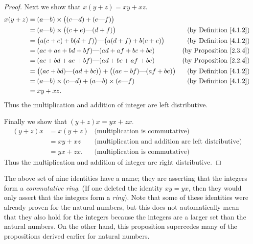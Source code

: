 \begin{proof}
    Next we show that \(x(y + z) = xy + xz\).
    \begin{align*}
        x(y + z) & = (a \text{---} b) \times \big((c \text{---} d) + (e \text{---} f)\big)                                                     \\
                 & = (a \text{---} b) \times \big((c + e) \text{---} (d + f)\big)                        & \text{(by Definition \ref{4.1.2})}  \\
                 & = \big(a(c + e) + b(d + f)\big) \text{---} \big(a(d + f) + b(c + e)\big)              & \text{(by Definition \ref{4.1.2})}  \\
                 & = (ac + ae + bd + bf) \text{---} (ad + af + bc + be)                                  & \text{(by Proposition \ref{2.3.4})} \\
                 & = (ac + bd + ae + bf) \text{---} (ad + bc + af + be)                                  & \text{(by Proposition \ref{2.2.4})} \\
                 & = \big((ac + bd) \text{---} (ad + bc)\big) + \big((ae + bf) \text{---} (af + be)\big) & \text{(by Definition \ref{4.1.2})}  \\
                 & = (a \text{---} b) \times (c \text{---} d) + (a \text{---} b) \times (e \text{---} f) & \text{(by Definition \ref{4.1.2})}  \\
                 & = xy + xz.
    \end{align*}
    Thus the multiplication and addition of integer are left distributive.

    Finally we show that \((y + z)x = yx + zx\).
    \begin{align*}
        (y + z)x & = x(y + z) & \text{(multiplication is commutative)}                     \\
                 & = xy + xz  & \text{(multiplication and addition are left distributive)} \\
                 & = yx + zx. & \text{(multiplication is commutative)}
    \end{align*}
    Thus the multiplication and addition of integer are right distributive.
\end{proof}

\begin{remark}\label{4.1.7}
    The above set of nine identities have a name; they are asserting that the integers form a \emph{commutative ring}.
    (If one deleted the identity \(xy = yx\), then they would only assert that the integers form a \emph{ring}).
    Note that some of these identities were already proven for the natural numbers, but this does not automatically mean that they also hold for the integers because the integers are a larger set than the natural numbers.
    On the other hand, this proposition supercedes many of the propositions derived earlier for natural numbers.
\end{remark}

